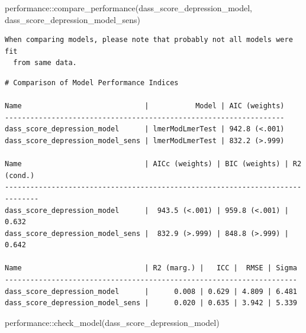 \documentclass[
  letterpaper,
  DIV=11,
  numbers=noendperiod]{scrartcl}
\newenvironment{Shaded}{\begin{snugshade}}{\end{snugshade}}
\newcommand{\FunctionTok}[1]{\textcolor[rgb]{0.28,0.35,0.67}{#1}}
\newcommand{\NormalTok}[1]{\textcolor[rgb]{0.00,0.23,0.31}{#1}}
\newcommand{\SpecialCharTok}[1]{\textcolor[rgb]{0.37,0.37,0.37}{#1}}
\begin{document}
\begin{Shaded}
\begin{Highlighting}[]
\NormalTok{performance}\SpecialCharTok{::}\FunctionTok{compare\_performance}\NormalTok{(dass\_score\_depression\_model, dass\_score\_depression\_model\_sens)}
\end{Highlighting}
\end{Shaded}

\begin{verbatim}
When comparing models, please note that probably not all models were fit
  from same data.
\end{verbatim}

\begin{verbatim}
# Comparison of Model Performance Indices

Name                             |           Model | AIC (weights)
------------------------------------------------------------------
dass_score_depression_model      | lmerModLmerTest | 942.8 (<.001)
dass_score_depression_model_sens | lmerModLmerTest | 832.2 (>.999)

Name                             | AICc (weights) | BIC (weights) | R2 (cond.)
------------------------------------------------------------------------------
dass_score_depression_model      |  943.5 (<.001) | 959.8 (<.001) |      0.632
dass_score_depression_model_sens |  832.9 (>.999) | 848.8 (>.999) |      0.642

Name                             | R2 (marg.) |   ICC |  RMSE | Sigma
---------------------------------------------------------------------
dass_score_depression_model      |      0.008 | 0.629 | 4.809 | 6.481
dass_score_depression_model_sens |      0.020 | 0.635 | 3.942 | 5.339
\end{verbatim}

\begin{Shaded}
\begin{Highlighting}[]
\NormalTok{performance}\SpecialCharTok{::}\FunctionTok{check\_model}\NormalTok{(dass\_score\_depression\_model)}
\end{Highlighting}
\end{Shaded}
\end{document}
